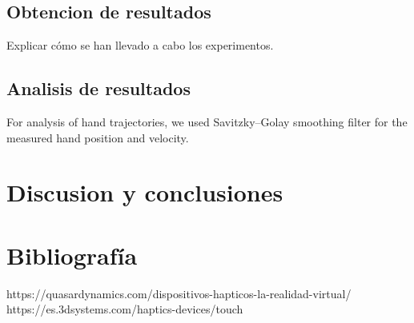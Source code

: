 \documentclass[a4paper,11pt, oneside]{book}
\begin{document}
\section{Obtencion de resultados}

Explicar cómo se han llevado a cabo los experimentos.

\section{Analisis de resultados}


For analysis of hand trajectories, we used Savitzky–Golay
smoothing filter for the measured hand position and velocity.
\chapter{Discusion y conclusiones}


\chapter{Bibliografía}
https://quasardynamics.com/dispositivos-hapticos-la-realidad-virtual/
https://es.3dsystems.com/haptics-devices/touch
\end{document}
